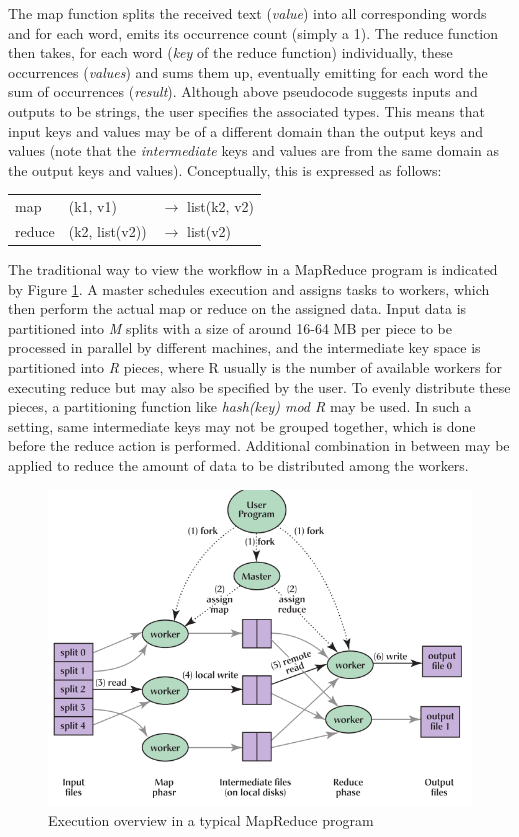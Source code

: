 The map function splits the received text (\textit{value}) into all corresponding words and for each word, emits its occurrence count (simply a 1). The reduce function then takes, for each word (\textit{key} of the reduce function) individually, these occurrences (\textit{values}) and sums them up, eventually emitting for each word the sum of occurrences (\textit{result}). Although above pseudocode suggests inputs and outputs to be strings, the user specifies the associated types. This means that input keys and values may be of a different domain than the output keys and values (note that the \textit{intermediate} keys and values are from the same domain as the output keys and values). Conceptually, this is expressed as follows:
\newline
\newline
\begin{tabular}{lll}
map	& (k1, v1) & $\to$ list(k2, v2)\\
reduce & (k2, list(v2)) & $\to$ list(v2)
\end{tabular}

The traditional way to view the workflow in a MapReduce program is indicated by Figure \ref{fig:mapreduce_workflow}. A master schedules execution and assigns tasks to workers, which then perform the actual map or reduce on the assigned data. Input data is partitioned into \textit{M} splits with a size of around 16-64 MB per piece to be processed in parallel by different machines, and the intermediate key space is partitioned into \textit{R} pieces, where R usually is the number of available workers for executing reduce but may also be specified by the user. To evenly distribute these pieces, a partitioning function like \textit{hash(key) mod R} may be used. In such a setting, same intermediate keys may not be grouped together, which is done before the reduce action is performed. Additional combination in between may be applied to reduce the amount of data to be distributed among the workers.

\begin{figure}
	\centering	
	\includegraphics{imgs/mapreduce_workflow}
	\caption{Execution overview in a typical MapReduce program}	
	\label{fig:mapreduce_workflow}
\end{figure} 
